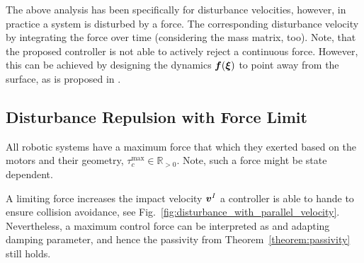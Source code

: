The above analysis has been specifically for disturbance velocities, however, in practice a system is disturbed by a force. The corresponding disturbance velocity by integrating the force over time (considering the mass matrix, too). 
Note, that the proposed controller is not able to actively reject a continuous force. However, this can be achieved by designing the dynamics $\boldsymbol{f}(\boldsymbol{\xi})$ to point away from the surface, as is proposed in \cite{huber2023avoidance}.

\subsection{Disturbance Repulsion with Force Limit}
All robotic systems have a maximum force that which they  exerted based on the motors and their geometry, $\tau_c^{\mathrm{max}} \in \mathbb{R}_{>0}$. Note, such a force might be state dependent.

A limiting force increases the impact velocity $\boldsymbol{v}^I$ a controller is able to hande to ensure collision avoidance, see Fig.~\ref{fig:disturbance_with_parallel_velocity}. Nevertheless, a maximum control force can be interpreted as and adapting damping parameter, and hence the passivity from Theorem~\ref{theorem:passivity} still holds.




